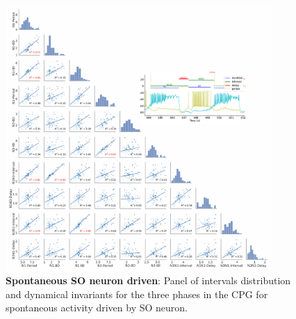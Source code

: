 \begin{figure}[htbp]
	\centering
	\includegraphics[width=0.9\textwidth]{./invariants/data/SUSSEX/prep4_so_driven_2/images/panel_with_pairplot.pdf}
	\caption{\textbf{Spontaneous SO neuron driven}: Panel of intervals distribution and dynamical invariants for the three phases in the CPG for spontaneous activity driven by SO neuron.}
	\label{fig:so spontaneous invariants pairplot}
\end{figure}
 	


